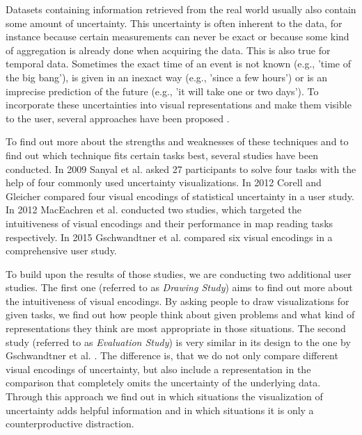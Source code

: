 Datasets containing information retrieved from the real world usually also contain some amount of uncertainty. This uncertainty is often inherent to the data, for instance because certain measurements can never be exact or because some kind of aggregation is already done when acquiring the data. This is also true for temporal data. Sometimes the exact time of an event is not known (e.g., 'time of the big bang'), is given in an inexact way (e.g., 'since a few hours') or is an imprecise prediction of the future (e.g., 'it will take one or two days'). To incorporate these uncertainties into visual representations and make them visible to the user, several approaches have been proposed \cite{kosara2001metaphors, chittaro2001visual, messner2000time, aigner2005planninglines, harris2000information}. \par \medskip

To find out more about the strengths and weaknesses of these techniques and to find out which technique fits certain tasks best, several studies have been conducted. In 2009 Sanyal et al. \cite{sanyal2009user} asked 27 participants to solve four tasks with the help of four commonly used uncertainty visualizations. In 2012 Corell and Gleicher \cite{correll2014error} compared four visual encodings of statistical uncertainty in a user study. In 2012 MacEachren et al. \cite{maceachren2012visual} conducted two studies, which targeted the intuitiveness of visual encodings and their performance in map reading tasks respectively. In 2015 Gschwandtner et al. \cite{gschwandtner2016visual} compared six visual encodings in a comprehensive user study. \par \medskip

To build upon the results of those studies, we are conducting two additional user studies. The first one (referred to as \textit{Drawing Study}) aims to find out more about the intuitiveness of visual encodings. By asking people to draw visualizations for given tasks, we find out how people think about given problems and what kind of representations they think are most appropriate in those situations. The second study (referred to as \textit{Evaluation Study}) is very similar in its design to the one by Gschwandtner et al. \cite{gschwandtner2016visual}. The difference is, that we do not only compare different visual encodings of uncertainty, but also include a representation in the comparison that completely omits the uncertainty of the underlying data. Through this approach we find out in which situations the visualization of uncertainty adds helpful information and in which situations it is only a counterproductive distraction. \par \medskip

